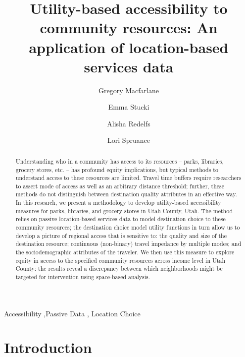 \documentclass[review, 3p]{elsarticle} %
\begin{document}
\begin{frontmatter}

  \title{Utility-based accessibility to community resources: An application of location-based services data}
    \author[BYUCE]{Gregory Macfarlane%
  }
    \author[BYUCE]{Emma Stucki%
  }
    \author[BYUPH]{Alisha Redelfs%
  }
    \author[BYUPH]{Lori Spruance%
  }
  
  \begin{abstract}
  Understanding who in a community has access to its resources -- parks, libraries,
  grocery stores, etc. -- has profound equity implications, but typical methods
  to understand access to these resources are limited. Travel time buffers require
  researchers to assert mode of access as well as an arbitrary distance threshold;
  further, these methods do not distinguish between destination quality attributes
  in an effective way. In this research, we present a methodology to develop
  utility-based accessibility measures for parks, libraries, and grocery stores
  in Utah County, Utah. The method relies on passive location-based services data
  to model destination choice to these community resources; the destination choice
  model utility functions in turn allow us to develop a picture of regional access
  that is sensitive to: the quality and size of the destination resource;
  continuous (non-binary) travel impedance by multiple modes; and the
  sociodemographic attributes of the traveler. We then use this measure
  to explore equity in access to the specified community resources across
  income level in Utah County: the results reveal a discrepancy between which
  neighborhoods might be targeted for intervention using space-based analysis.
  \end{abstract}
    \begin{keyword}
    Accessibility \sep Passive Data \sep 
    Location Choice
  \end{keyword}
  
 \end{frontmatter}

\hypertarget{intro}{%
\section{Introduction}\label{intro}}
\end{document}
